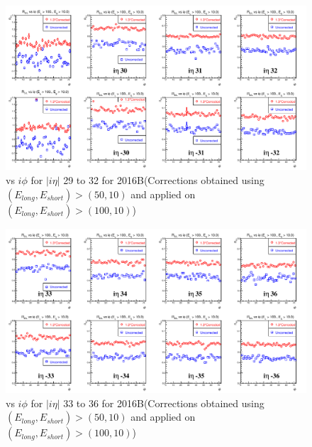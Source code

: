 \begin{figure}[h!]
\centering
\includegraphics[width=0.99\linewidth]{../Figures/Chap2/ImageFiles_HF/Ratio/2016/Corrected/EnergyCut10010/ieta29_32_E1E2Cut4Ietaiphi_Crrtd}
\caption{\ratiosl vs $i\phi$ for $|i\eta|$ 29 to 32 for 2016B(Corrections obtained using $(E_{long},E_{short})>(50,10)$ and applied on $(E_{long},E_{short})>(100,10)$)}
\label{fig:ieta29_32_E1E2Cut4Ietaiphi_Crrtd}
\end{figure}
\begin{figure}[h!]
\centering
\includegraphics[width=0.99\linewidth]{../Figures/Chap2/ImageFiles_HF/Ratio/2016/Corrected/EnergyCut10010/ieta33_36_E1E2Cut4Ietaiphi_Crrtd}
\caption{\ratiosl vs $i\phi$ for $|i\eta|$ 33 to 36 for 2016B(Corrections obtained using $(E_{long},E_{short})>(50,10)$ and applied on $(E_{long},E_{short})>(100,10)$)}
\label{fig:ieta33_36_E1E2Cut4Ietaiphi_Crrtd}
\end{figure}

